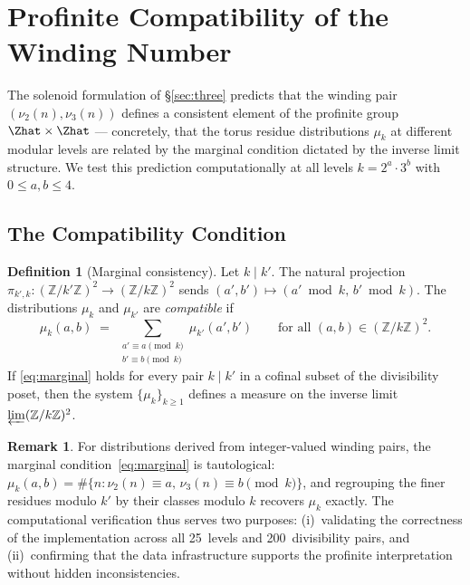 \documentclass[11pt,a4paper]{article}
\newcommand{\Z}{\mathbb{Z}}
\theoremstyle{plain}
\theoremstyle{definition}
\newtheorem{definition}[theorem]{Definition}
\newtheorem{remark}[theorem]{Remark}
\begin{document}
\section{Profinite Compatibility of the Winding Number}\label{sec:profinite-compat}

The solenoid formulation of \S\ref{sec:three} predicts that the winding pair
$(\nu_2(n), \nu_3(n))$ defines a consistent element of the profinite group
$\Zhat \times \Zhat$ --- concretely, that the torus residue distributions
$\mu_k$ at different modular levels are related by the marginal condition
dictated by the inverse limit structure.  We test this prediction
computationally at all levels $k = 2^a \cdot 3^b$ with $0 \leq a, b \leq 4$.


\subsection{The Compatibility Condition}

\begin{definition}[Marginal consistency]\label{def:marginal}
    Let $k \mid k'$.  The natural projection $\pi_{k',k}: (\Z/k'\Z)^2 \to
    (\Z/k\Z)^2$ sends $(a', b') \mapsto (a' \bmod k, \, b' \bmod k)$.
    The distributions $\mu_k$ and $\mu_{k'}$ are \emph{compatible} if
    \begin{equation}\label{eq:marginal}
        \mu_k(a, b) \;=\; \sum_{\substack{a' \equiv a \pmod{k} \\
        b' \equiv b \pmod{k}}} \mu_{k'}(a', b')
        \qquad \text{for all } (a, b) \in (\Z/k\Z)^2.
    \end{equation}
    If \eqref{eq:marginal} holds for every pair $k \mid k'$ in a cofinal
    subset of the divisibility poset, then the system
    $\{\mu_k\}_{k \geq 1}$ defines a measure on the inverse limit
    $\varprojlim (\Z/k\Z)^2$.
\end{definition}

\begin{remark}
    For distributions derived from integer-valued winding pairs, the
    marginal condition~\eqref{eq:marginal} is tautological:
    $\mu_k(a,b) = \#\{n : \nu_2(n) \equiv a, \, \nu_3(n) \equiv b
    \pmod{k}\}$, and regrouping the finer residues modulo $k'$ by their
    classes modulo $k$ recovers $\mu_k$ exactly.  The computational
    verification thus serves two purposes: (i)~validating the correctness
    of the implementation across all 25~levels and 200~divisibility pairs,
    and (ii)~confirming that the data infrastructure supports the
    profinite interpretation without hidden inconsistencies.
\end{remark}
\end{document}

